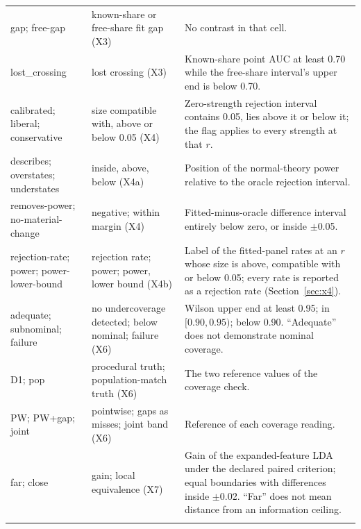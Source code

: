 \begin{table}[htbp]
\begin{tabular}{@{}>{\raggedright\arraybackslash}p{}>{\raggedright\arraybackslash}p{}>{\raggedright\arraybackslash}p{}@{}}
gap; free-gap & known-share or free-share fit gap (X3) & No contrast in that cell. \\
lost\_crossing & lost crossing (X3) & Known-share point AUC at least 0.70 while the free-share interval's upper end is below 0.70. \\
calibrated; liberal; conservative & size compatible with, above or below 0.05 (X4) & Zero-strength rejection interval contains 0.05, lies above it or below it; the flag applies to every strength at that $r$. \\
describes; overstates; understates & inside, above, below (X4a) & Position of the normal-theory power relative to the oracle rejection interval. \\
removes-power; no-material-change & negative; within margin (X4) & Fitted-minus-oracle difference interval entirely below zero, or inside $\pm$0.05. \\
rejection-rate; power; power-lower-bound & rejection rate; power; power, lower bound (X4b) & Label of the fitted-panel rates at an $r$ whose size is above, compatible with or below 0.05; every rate is reported as a rejection rate (Section~\ref{sec:x4}). \\
adequate; subnominal; failure & no undercoverage detected; below nominal; failure (X6) & Wilson upper end at least 0.95; in $[0.90, 0.95)$; below 0.90. ``Adequate'' does not demonstrate nominal coverage. \\
D1; pop & procedural truth; population-match truth (X6) & The two reference values of the coverage check. \\
PW; PW+gap; joint & pointwise; gaps as misses; joint band (X6) & Reference of each coverage reading. \\
far; close & gain; local equivalence (X7) & Gain of the expanded-feature LDA under the declared paired criterion; equal boundaries with differences inside $\pm$0.02. ``Far'' does not mean distance from an information ceiling. \\
\botrule
\end{tabular}
\end{table}

